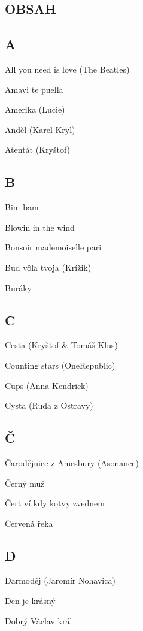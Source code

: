 \begin{LARGE}
    \section*{\Huge OBSAH}
\end{LARGE}

\begin{multicols}{2}

\subsection*{A}
All you need is love (The Beatles)

Amavi te puella

Amerika (Lucie)

Anděl (Karel Kryl)

Atentát (Kryštof)

\subsection*{B}
Bim bam

Blowin in the wind

Bonsoir mademoiselle pari

Buď vôľa tvoja (Krížik)

Buráky

\subsection*{C}
Cesta (Kryštof \& Tomáš Klus)

Counting stars (OneRepublic)

Cups (Anna Kendrick)

Cysta (Ruda z Ostravy)

\subsection*{Č}
Čarodějnice z Amesbury (Asonance)

Černý muž

Čert ví kdy kotvy zvednem

Červená řeka

\subsection*{D}
Darmoděj (Jaromír Nohavica)

Den je krásný

Dobrý Václav král


\end{multicols}
